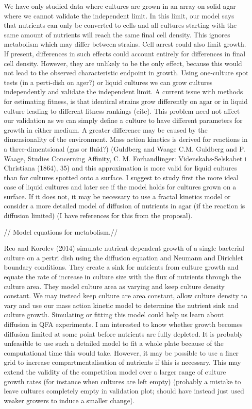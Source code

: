 We have only studied data where cultures are grown in an array on
solid agar where we cannot validate the independent limit. In this
limit, our model says that nutrients can only be converted to cells
and all cultures starting with the same amount of nutrients will reach
the same final cell density. This ignores metabolism which may differ
between strains. Cell arrest could also limit growth. If present,
differences in such effects could account entirely for differences in
final cell density. However, they are unlikely to be the only effect,
because this would not lead to the observed characteristic endpoint in
growth. Using one-culture spot tests (in a perti-dish on ager?) or
liquid cultures we can grow cultures independently and validate the
independent limit. A current issue with methods for estimating
fitness, is that identical strains grow differently on agar or in
liquid culture leading to different fitness rankings (cite). This
problem need not affect our validation as we can simply define a
culture to have different parameters for growth in either medium. A
greater difference may be caused by the dimensionality of the
environment. Mass action kinetics is derived for reactions in a
three-dimentsional (gas or fluid?) (Guldberg and Waage C.M. Guldberg
and P. Waage, Studies Concerning Affinity, C. M. Forhandlinger:
Videnskabs-Selskabet i Christiana (1864), 35) and this approximation
is more valid for liquid cultures than for cultures spotted onto a
surface. I suggest to study first the more ideal case of liquid cultures
and later see if the model holds for cultures grown on a surface. If
it does not, it may be necessary to use a fractal kinetics model or
consider a more detailed model of diffusion of nutrients in agar (if
the reaction is diffusion limited) (I have references for this from
the proposal).

// Model equations for metabolism.//

Reo and Korolev (2014) simulate nutrient dependent growth of a single
bacterial culture on a pertri dish using the diffusion equation and
Neumann and Dirichlet boundary conditions. They create a sink for
nutrients from culture growth and equate the rate of increase in
culture size with the flux of nutrients through the culture area. They
model culture area as varying and keep culture density constant. We
may instead keep culture are area constant, allow culture density to
vary and use our mass action kinetic model to determine the nutrient
sink and culture growth. Simulating or fitting this model could help
us learn about diffusion in QFA experiments. I am interested to know
whether growth becomes diffusion limited at some point before
nutrients are fully depleted. It is probably unfeasible to use such a
detailed model to fit a whole plate because of the computational time
this would take. However, it may be possible to use a finer grid to
increase compartmentalisation of nutrients if this is necessary. This
may extend the validity of the competition model over a larger range
of culture growth rates (for instance when cultures are left empty)
(probably a mistake to leave cultures completely empty in validation
plot; should have instead just used weaker growers to induce a smaller
change).



